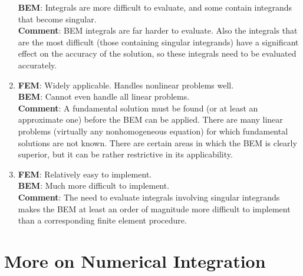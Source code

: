 \begin{enumerate}
  \textbf{BEM}: Integrals are more difficult to evaluate, and some contain 
  integrands that become singular. \\
  \textbf{Comment}: BEM integrals are far harder to evaluate.  Also the 
  integrals that are the most difficult (those containing singular integrands)
  have a significant effect on the accuracy of the solution, so these integrals
  need to be evaluated accurately.
\item \textbf{FEM}: Widely applicable.  Handles nonlinear problems well. \\
  \textbf{BEM}: Cannot even handle all linear problems. \\
  \textbf{Comment}: A fundamental solution must be found (or at least an 
  approximate one) before the BEM can be applied.  There are many linear 
  problems (\eg virtually any nonhomogeneous equation) for which fundamental
  solutions are not known.  There are certain areas in which the BEM is 
  clearly superior, but it can be rather restrictive in its applicability.
\item \textbf{FEM}: Relatively easy to implement. \\
  \textbf{BEM}: Much more difficult to implement. \\
  \textbf{Comment}: The need to evaluate integrals involving singular integrands
  makes the BEM at least an order of magnitude more difficult to implement 
  than a corresponding finite element procedure.
\end{enumerate}




  


\section{More on Numerical Integration}
\label{sec:MNI}

